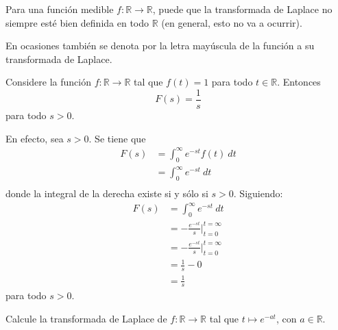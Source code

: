 \documentclass[12pt]{report}
\newcounter{it}
\theoremstyle{largebreak}
\newcommand\cf[3]{\ensuremath{#1:#2\rightarrow#3}}
\begin{document}
    \begin{obs}
        Para una función medible $\cf{f}{\mathbb{R}}{\mathbb{R}}$, puede que la transformada de Laplace no siempre esté bien definida en todo $\mathbb{R}$ (en general, esto no va a ocurrir).

        En ocasiones también se denota por la letra mayúscula de la función a su transformada de Laplace.
    \end{obs}

    \begin{exa}
        Considere la función $\cf{f}{\mathbb{R}}{\mathbb{R}}$ tal que $f(t)=1$ para todo $t\in\mathbb{R}$. Entonces
        \begin{equation*}
            F(s)=\frac{1}{s}
        \end{equation*}
        para todo $s>0$.
    \end{exa}

    \begin{sol}
        En efecto, sea $s>0$. Se tiene que
        \begin{equation*}
            \begin{split}
                F(s)&=\int_{0}^\infty e^{ -st}f(t)\:dt\\
                &=\int_{0}^\infty e^{ -st}\:dt\\
            \end{split}
        \end{equation*}
        donde la integral de la derecha existe si y sólo si $s>0$. Siguiendo:
        \begin{equation*}
            \begin{split}
                F(s)&=\int_{0}^\infty e^{ -st}\:dt\\
                &=-\frac{e^{ -st}}{s}\Big|_{ t=0}^{ t=\infty}\\
                &=-\frac{e^{ -st}}{s}\Big|_{ t=0}^{ t=\infty}\\
                &=\frac{1}{s}-0\\
                &=\frac{1}{s}
            \end{split}
        \end{equation*}
        para todo $s>0$.
    \end{sol}

    \begin{excer}
        Calcule la transformada de Laplace de $\cf{f}{\mathbb{R}}{\mathbb{R}}$ tal que $t\mapsto e^{ -at}$, con $a\in\mathbb{R}$.
    \end{excer}
\end{document}
